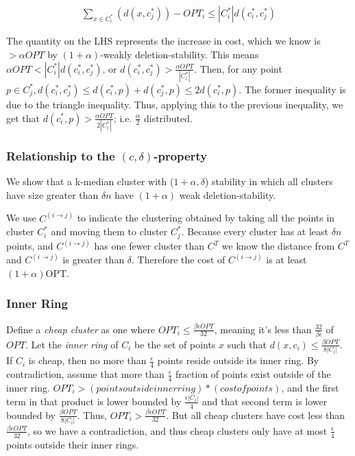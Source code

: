 \documentclass[paper=a4, fontsize=11pt]{scrartcl} %
\numberwithin{equation}{section} %
\numberwithin{figure}{section} %
\numberwithin{table}{section} %
\begin{document}
\begin{align}
\sum_{x \in C^*_i} (d(x, c^*_j) )  - OPT_i \leq |C^*_i| d(c^*_i, c^*_j)
\end{align}

The quantity on the LHS represents the increase in cost, which we know is $ > \alpha OPT$ by $(1+\alpha)$-weakly deletion-stability. This means $\alpha OPT < |C^*_i| d(c^*_i, c^*_j)$, or $d(c^*_i, c^*_j) >\frac{\alpha OPT}{|C^*_i|}$.  Then, for any point $p \in C^*_j, d(c^*_i, c^*_j) \leq d(c^*_i, p) + d(c^*_j, p) \leq 2d(c^*_i, p)$. The former inequality is due to the triangle inequality.  Thus, applying this to the previous inequality, we get that $d(c^*_i, p) > \frac{\alpha OPT}{2 |C^*_i|}$; i.e. $\frac{\alpha}{2}$ distributed.

\subsubsection{Relationship to the $(c, \delta)$-property}

We show that a k-median cluster with ($1+\alpha, \delta$) stability in which all clusters have size greater than $\delta n$ have $(1+\alpha)$ weak deletion-stability.

We use $C^{(i\rightarrow j)}$ to indicate the clustering obtained by taking all the points in cluster $C_i^*$ and moving them to cluster $C_j^*$. Because every cluster has at least $\delta n$ points, and $C^{(i \rightarrow j)}$ has one fewer cluster than $C^T$ we know the distance from $C^T$ and $C^{(i\rightarrow j)}$ is greater than $\delta$. Therefore the cost of $C^{(i\rightarrow j)}$ is at least $(1 + \alpha)\text{OPT}$.

\subsubsection{Inner Ring}


Define a \emph{cheap cluster} as one where $OPT_i \leq \frac{\beta \epsilon OPT}{32}$, meaning it's less than $\frac{32}{\beta \epsilon}$ of $OPT$.  Let the \emph{inner ring} of $C_i$ be the set of points $x$ such that $d(x, c_i) \leq \frac{ \beta OPT }{8 |C_i|}$.  If $C_i$ is cheap, then no more than $\frac{\epsilon}{4}$ points reside outside its inner ring.  By contradiction, assume that more than $\frac{\epsilon}{4}$ fraction of points exist outside of the inner ring.  $OPT_i > (points outside inner ring) * (cost of points)$, and the first term in that product is lower bounded by $\frac{\epsilon |C_i|}{4}$ and that second term is lower bounded by $\frac{\beta OPT}{8 |C_i|}$.  Thus, $OPT_i > \frac{\beta \epsilon OPT }{32}$.  But all cheap clusters have cost less than $\frac{\beta \epsilon OPT}{32}$, so we have a contradiction, and thus cheap clusters only have at most $\frac{\epsilon}{4}$ points outside their inner rings.
\end{document}
